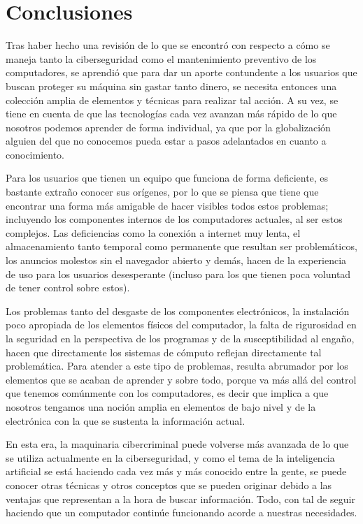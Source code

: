 \pagebreak
\section{Conclusiones}

Tras haber hecho una revisión de lo que se encontró con respecto a cómo se
maneja tanto la ciberseguridad como el mantenimiento preventivo de los
computadores, se aprendió que para dar un aporte contundente a los usuarios que
buscan proteger su máquina sin gastar tanto dinero, se necesita entonces una
colección amplia de elementos y técnicas para realizar tal acción. A su vez,
se tiene en cuenta de que las tecnologías cada vez avanzan más rápido de lo que
nosotros podemos aprender de forma individual, ya que por la globalización
alguien del que no conocemos pueda estar a pasos adelantados en cuanto a
conocimiento.

Para los usuarios que tienen un equipo que funciona de forma deficiente, es
bastante extraño conocer sus orígenes, por lo que se piensa que tiene que
encontrar una forma más amigable de hacer visibles todos estos problemas;
incluyendo los componentes internos de los computadores actuales, al ser estos
complejos. Las deficiencias como la conexión a internet muy lenta, el
almacenamiento tanto temporal como permanente que resultan ser problemáticos,
los anuncios molestos sin el navegador abierto y demás, hacen de la
experiencia de uso para los usuarios desesperante (incluso para los que tienen
poca voluntad de tener control sobre estos).

Los problemas tanto del desgaste de los componentes electrónicos, la instalación
poco apropiada de los elementos físicos del computador, la falta de rigurosidad
en la seguridad en la perspectiva de los programas y de la susceptibilidad al
engaño, hacen que directamente los sistemas de cómputo reflejan directamente tal
problemática. Para atender a este tipo de problemas, resulta abrumador por los
elementos que se acaban de aprender y sobre todo, porque va más allá del control
que tenemos comúnmente con los computadores, es decir que implica a que nosotros
tengamos una noción amplia en elementos de bajo nivel y de la electrónica con la
que se sustenta la información actual.

En esta era, la maquinaria cibercriminal puede volverse más avanzada de lo que
se utiliza actualmente en la ciberseguridad, y como el tema de la inteligencia
artificial se está haciendo cada vez más y más conocido entre la gente, se puede
conocer otras técnicas y otros conceptos que se pueden originar debido a las
ventajas que representan a la hora de buscar información. Todo, con tal de 
seguir haciendo que un computador continúe funcionando acorde a nuestras
necesidades.
